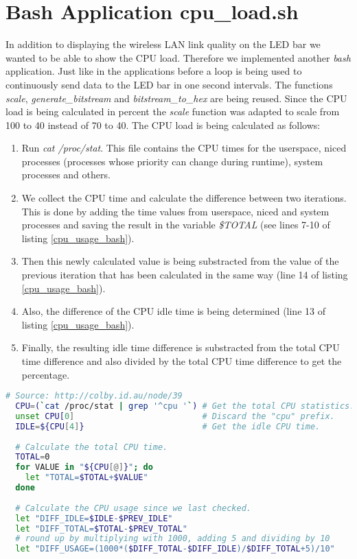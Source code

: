 \section{Bash Application cpu\_load.sh}

In addition to displaying the wireless LAN link quality on the LED bar we wanted to be able to show the CPU load. Therefore we implemented another \textit{bash} application.  Just like in the applications before a loop is being used to continuously send data to the LED bar in one second intervals. The functions \textit{scale}, \textit{generate\_bitstream} and \textit{bitstream\_to\_hex} are being reused. Since the CPU load is being calculated in percent the \textit{scale} function was adapted to scale from 100 to 40 instead of 70 to 40. The CPU load is being calculated as follows:

\begin{enumerate} 

\item Run \textit{cat /proc/stat}. This file contains the CPU times for the userspace, niced processes (processes whose priority can change during runtime), system processes and others.

\item We collect the CPU time and calculate the difference between two iterations. This is done by adding the time values from userspace, niced and system processes and saving the result in the variable \textit{\$TOTAL} (see lines 7-10 of listing \ref{cpu_usage_bash}). 

\item Then this newly calculated value is being substracted from the value of the previous iteration that has been calculated in the same way (line 14 of listing \ref{cpu_usage_bash}). 

\item Also, the difference of the CPU idle time is being determined (line 13 of listing \ref{cpu_usage_bash}). 

\item Finally, the resulting idle time difference is substracted from the total CPU time difference and also divided by the total CPU time difference to get the percentage.

\end{enumerate}

\begin{lstlisting}[language=bash, caption=Calculation of CPU usage, label=cpu_usage_bash]
  # Source: http://colby.id.au/node/39
  CPU=(`cat /proc/stat | grep '^cpu '`) # Get the total CPU statistics.
  unset CPU[0]                          # Discard the "cpu" prefix.
  IDLE=${CPU[4]}                        # Get the idle CPU time.
 
  # Calculate the total CPU time.
  TOTAL=0
  for VALUE in "${CPU[@]}"; do
    let "TOTAL=$TOTAL+$VALUE"
  done
 
  # Calculate the CPU usage since we last checked.
  let "DIFF_IDLE=$IDLE-$PREV_IDLE"
  let "DIFF_TOTAL=$TOTAL-$PREV_TOTAL"
  # round up by multiplying with 1000, adding 5 and dividing by 10
  let "DIFF_USAGE=(1000*($DIFF_TOTAL-$DIFF_IDLE)/$DIFF_TOTAL+5)/10"
\end{lstlisting}

